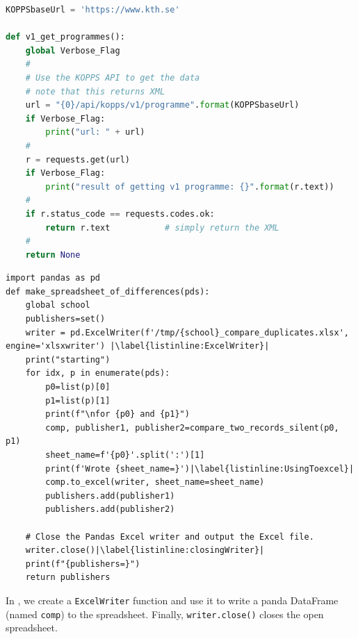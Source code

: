 \documentclass[
English,                 %
includepublications,    %
%
%
%
%
%
%
%
%
%
%
%
%
%
%
%
%
%
%
]{kththesis}
\begin{document}



\lstset{extendedchars=true}  %
\begin{lstlisting}[language={Python}, caption={Using a python program to
    access the KTH API to get all of the programs at KTH}, label=lst:programmes]
KOPPSbaseUrl = 'https://www.kth.se'

def v1_get_programmes():
    global Verbose_Flag
    #
    # Use the KOPPS API to get the data
    # note that this returns XML
    url = "{0}/api/kopps/v1/programme".format(KOPPSbaseUrl)
    if Verbose_Flag:
        print("url: " + url)
    #
    r = requests.get(url)
    if Verbose_Flag:
        print("result of getting v1 programme: {}".format(r.text))
    #
    if r.status_code == requests.codes.ok:
        return r.text           # simply return the XML
    #
    return None
\end{lstlisting}
\FloatBarrier

\begin{listing}[!ht]
\begin{verbatim}
import pandas as pd
def make_spreadsheet_of_differences(pds):
    global school
    publishers=set()
    writer = pd.ExcelWriter(f'/tmp/{school}_compare_duplicates.xlsx', engine='xlsxwriter') |\label{listinline:ExcelWriter}|
    print("starting")
    for idx, p in enumerate(pds):
        p0=list(p)[0]
        p1=list(p)[1]
        print(f"\nfor {p0} and {p1}")
        comp, publisher1, publisher2=compare_two_records_silent(p0, p1)
        sheet_name=f'{p0}'.split(':')[1]
        print(f'Wrote {sheet_name=}')|\label{listinline:UsingToexcel}|
        comp.to_excel(writer, sheet_name=sheet_name)
        publishers.add(publisher1)
        publishers.add(publisher2)
    
    # Close the Pandas Excel writer and output the Excel file.
    writer.close()|\label{listinline:closingWriter}|
    print(f"{publishers=}")
    return publishers
\end{verbatim}
\caption[Using minted with python code]{Using \texttt{minted} with python code}
\label{lst:exampleUsingMinted}
\end{listing}

\noindent In , we create a \texttt{ExcelWriter} function and use it to write a panda DataFrame (named \texttt{comp}) to the spreadsheet. Finally, \texttt{writer.close()} closes the open spreadsheet.
\FloatBarrier
\end{document}
